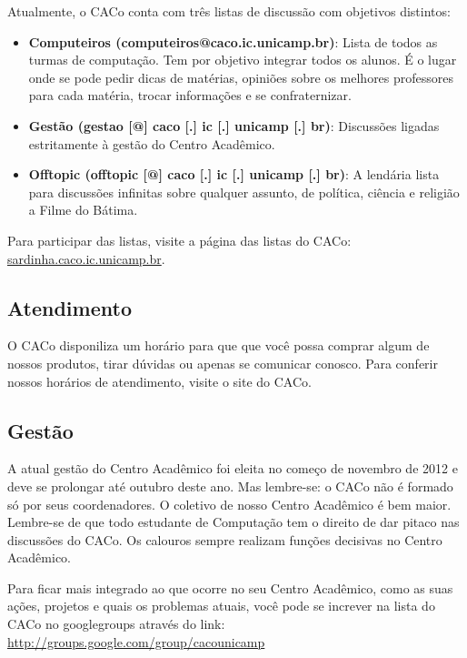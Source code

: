 Atualmente, o CACo conta com três listas de discussão com objetivos distintos:

\begin{itemize}
\item  \textbf{Computeiros (computeiros@caco.ic.unicamp.br)}: Lista de todos as turmas de computação. Tem por objetivo integrar todos os alunos. É o lugar onde se pode pedir dicas de matérias, opiniões sobre os melhores professores para cada matéria, trocar informações e se confraternizar.
\end{itemize}

\begin{itemize}
\item  \textbf{Gestão (gestao [@] caco [.] ic [.] unicamp [.] br)}: Discussões ligadas estritamente à gestão do Centro Acadêmico.
\end{itemize}

\begin{itemize}
\item  \textbf{Offtopic (offtopic [@] caco [.] ic [.] unicamp [.] br)}: A lendária lista para discussões infinitas sobre qualquer assunto, de política, ciência e religião a Filme do Bátima.
\end{itemize}

Para participar das listas, visite a página das listas do CACo:
\url{sardinha.caco.ic.unicamp.br}.

\subsection{Atendimento}

O CACo disponiliza um horário para que que você possa comprar algum de nossos
produtos, tirar dúvidas ou apenas se comunicar conosco. Para conferir nossos
horários de atendimento, visite o site do CACo.


\subsection{Gestão}

A atual gestão do Centro Acadêmico foi eleita no começo de novembro de 2012 e deve
se prolongar até outubro deste ano. Mas lembre-se: o CACo não é formado só por
seus coordenadores. O coletivo de nosso Centro Acadêmico é bem maior. Lembre-se
de que todo estudante de Computação tem o direito de dar pitaco nas discussões
do CACo. Os calouros sempre realizam funções decisivas no Centro Acadêmico.

Para ficar mais integrado ao que ocorre no seu Centro Acadêmico, como as suas
ações, projetos e quais os problemas atuais, você pode se increver na lista do
CACo no googlegroups através do link:
\url{http://groups.google.com/group/cacounicamp}

